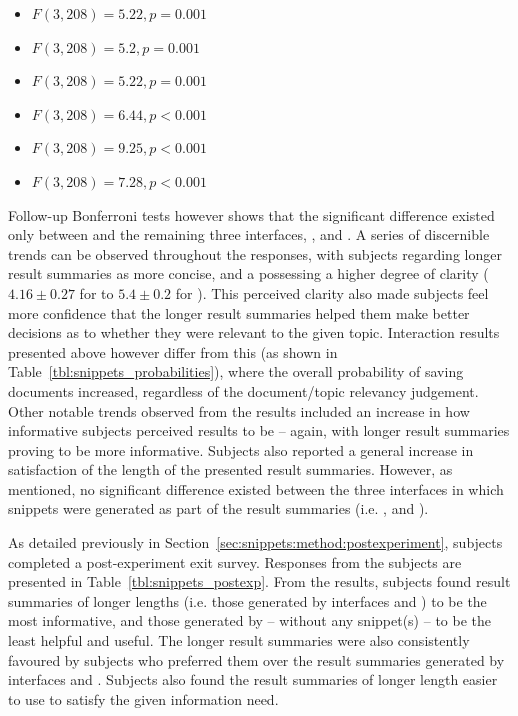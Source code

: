 \begin{itemize}
    \item{ $F(3,208)=5.22, p=0.001$}
    \item{ $F(3,208)=5.2, p=0.001$}
    \item{ $F(3,208)=5.22, p=0.001$}
    \item{ $F(3,208)=6.44, p<0.001$}
    \item{ $F(3,208)=9.25, p<0.001$}
    \item{ $F(3,208)=7.28, p<0.001$}
\end{itemize}

Follow-up Bonferroni tests however shows that the significant difference existed only between  and the remaining three interfaces, ,  and . A series of discernible trends can be observed throughout the responses, with subjects regarding longer result summaries as more concise, and a possessing a higher degree of clarity ($4.16\pm0.27$ for  to $5.4\pm0.2$ for ). This perceived clarity also made subjects feel more confidence that the longer result summaries helped them make better decisions as to whether they were relevant to the given topic. Interaction results presented above however differ from this (as shown in Table~\ref{tbl:snippets_probabilities}), where the overall probability of saving documents increased, regardless of the document/topic relevancy judgement. Other notable trends observed from the results included an increase in how informative subjects perceived results to be -- again, with longer result summaries proving to be more informative. Subjects also reported a general increase in satisfaction of the length of the presented result summaries. However, as mentioned, no significant difference existed between the three interfaces in which snippets were generated as part of the result summaries (i.e. ,  and ).

As detailed previously in Section~\ref{sec:snippets:method:postexperiment}, subjects completed a post-experiment exit survey. Responses from the subjects are presented in Table~\ref{tbl:snippets_postexp}. From the results, subjects found result summaries of longer lengths (i.e. those generated by interfaces  and ) to be the most informative, and those generated by  -- without any snippet(s) -- to be the least helpful and useful. The longer result summaries were also consistently favoured by subjects who preferred them over the result summaries generated by interfaces  and . Subjects also found the result summaries of longer length easier to use to satisfy the given information need.

